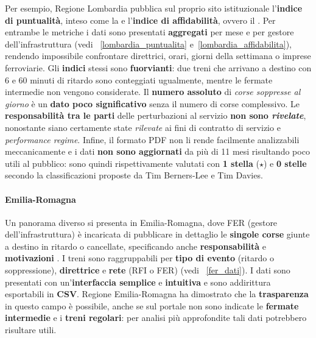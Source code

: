 \documentclass[12pt,italian]{report}
\begin{document}
Per esempio, Regione Lombardia pubblica sul proprio sito istituzionale
\cite{LombardiaDati} l'\textbf{indice di puntualità}, inteso come la
 e
l'\textbf{indice di affidabilità}, ovvero il .  Per entrambe le metriche i
dati sono presentati \textbf{aggregati} per mese e per gestore
dell'infrastruttura (vedi \figurename~\ref{lombardia_puntualita}
e~\ref{lombardia_affidabilita}), rendendo impossibile confrontare
direttrici, orari, giorni della settimana o imprese ferroviarie.  Gli
\textbf{indici} stessi sono \textbf{fuorvianti}: due treni che
arrivano a destino con 6 e 60 minuti di ritardo sono conteggiati
ugualmente, mentre le fermate intermedie non vengono considerate.  Il
\textbf{numero assoluto} di \textit{corse soppresse al giorno} è un
\textbf{dato poco significativo} senza il numero di corse complessivo.
Le \textbf{responsabilità tra le parti} delle perturbazioni al
servizio \textbf{non sono \textit{rivelate}}, nonostante siano
certamente state \textit{rilevate} ai fini di contratto di servizio e
\textit{performance regime}.  Infine, il formato PDF non li rende
facilmente analizzabili meccanicamente e i dati \textbf{non sono
    aggiornati} da più di 11 mesi risultando poco utili al pubblico:
sono quindi rispettivamente valutati con \textbf{1 stella} ($\star$) e
\textbf{0 stelle} secondo la classificazioni proposte da Tim
Berners-Lee e Tim Davies.

\paragraph{Emilia-Romagna}
Un panorama diverso si presenta in Emilia-Romagna, dove FER (gestore
dell'infrastruttura) è incaricata di pubblicare in dettaglio le
\textbf{singole corse} giunte a destino in ritardo o cancellate,
specificando anche \textbf{responsabilità} e \textbf{motivazioni}
\cite{FerDati}.  I treni sono raggruppabili per \textbf{tipo di
    evento} (ritardo o soppressione), \textbf{direttrice} e
\textbf{rete} (RFI o FER) (vedi \figurename~\ref{fer_dati}).  I dati
sono presentati con un'\textbf{interfaccia semplice} e
\textbf{intuitiva} e sono addirittura esportabili in \textbf{CSV}.
Regione Emilia-Romagna ha dimostrato che la \textbf{trasparenza} in
questo campo è possibile, anche se sul portale non sono indicate le
\textbf{fermate intermedie} e i \textbf{treni regolari}: per analisi
più approfondite tali dati potrebbero risultare utili.
\end{document}
